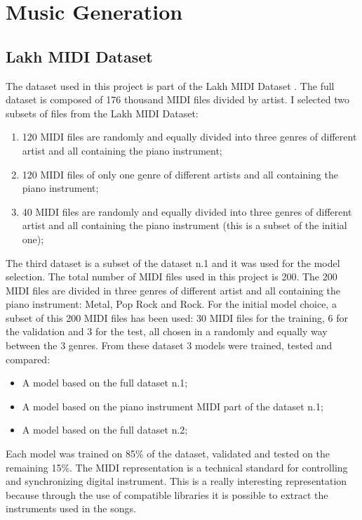\section{Music Generation}

\subsection{Lakh MIDI Dataset}
The dataset used in this project is part of the Lakh MIDI Dataset \cite{lakh}. The full dataset is composed of 176 thousand MIDI files divided by artist.
I selected two subsets of files from the Lakh MIDI Dataset:
\begin{enumerate}
	\item 120 MIDI files are randomly and equally divided into three genres of different artist and all containing the piano instrument;
	\label{dataset1}
	\item 120 MIDI files of only one genre of different artists and all containing the piano instrument;
	\label{dataset2}
	\item 40 MIDI files are randomly and equally divided into three genres of different artist and all containing the piano instrument (this is a subset of the initial one);
	\label{dataset3}
\end{enumerate}
The third dataset is a subset of the dataset n.1 and it was used for the model selection.
The total number of MIDI files used in this project is 200. The 200 MIDI files are divided in three genres of different artist and all containing the piano instrument: Metal, Pop Rock and Rock.
For the initial model choice, a subset of this 200 MIDI files has been used: 30 MIDI files for the training, 6 for the validation and 3 for the test, all chosen in a randomly and equally way between the 3 genres.
From these dataset 3 models were trained, tested and compared:
\begin{itemize}
	\item A model based on the full dataset n.1;
	\item A model based on the piano instrument MIDI part of the dataset n.1;
	\item A model based on the full dataset n.2;
\end{itemize}
Each model was trained on 85\% of the dataset, validated and tested on the remaining 15\%.
The MIDI representation is a technical standard for controlling and synchronizing digital instrument. 
This is a really interesting representation because through the use of compatible libraries it is possible to extract the instruments used in the songs. 

